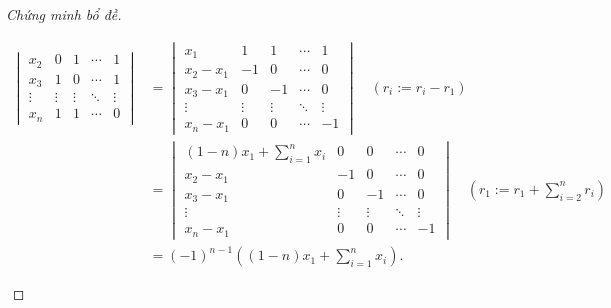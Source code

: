 \documentclass[class=nhvh-linear-algebra,crop=false]{standalone}
\begin{document}
\begin{proof}[Chứng minh bổ đề]
\begin{enumerate}[label = (\roman*)]
\begin{align*}
\begin{vmatrix}
				      x_{2}  & 0      & 1      & \cdots & 1      \\
				      x_{3}  & 1      & 0      & \cdots & 1      \\
				      \vdots & \vdots & \vdots & \ddots & \vdots \\
				      x_{n}  & 1      & 1      & \cdots & 0
			      \end{vmatrix}
			       & =
			      \begin{vmatrix}
				      x_{1}         & 1      & 1      & \cdots & 1      \\
				      x_{2} - x_{1} & -1     & 0      & \cdots & 0      \\
				      x_{3} - x_{1} & 0      & -1     & \cdots & 0      \\
				      \vdots        & \vdots & \vdots & \ddots & \vdots \\
				      x_{n} - x_{1} & 0      & 0      & \cdots & -1
			      \end{vmatrix}\quad(r_{i}:= r_{i} - r_{1})                                 \\
			       & =
			      \begin{vmatrix}
				      (1-n)x_{1} + \displaystyle\sum^{n}_{i=1}x_{i} & 0      & 0      & \cdots & 0      \\
				      x_{2} - x_{1}                                 & -1     & 0      & \cdots & 0      \\
				      x_{3} - x_{1}                                 & 0      & -1     & \cdots & 0      \\
				      \vdots                                        & \vdots & \vdots & \ddots & \vdots \\
				      x_{n} - x_{1}                                 & 0      & 0      & \cdots & -1
			      \end{vmatrix}\quad(r_{1}:= r_{1} + \sum^{n}_{i=2}r_{i}) \\
			       & = {(-1)}^{n-1}\left((1-n)x_{1} + \sum^{n}_{i=1}x_{i}\right).
		      \end{align*}
		      \endgroup{}


\end{enumerate}
\end{proof}
\end{document}
